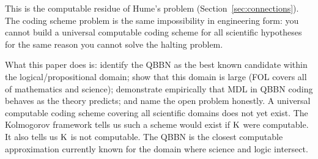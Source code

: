 This is the computable residue of Hume's problem
(Section~\ref{sec:connections}). The coding scheme problem is the same
impossibility in engineering form: you cannot build a universal
computable coding scheme for all scientific hypotheses for the same
reason you cannot solve the halting problem.

What this paper does is: identify the QBBN as the best known candidate
within the logical/propositional domain; show that this domain is
large (FOL covers all of mathematics and science); demonstrate
empirically that MDL in QBBN coding behaves as the theory predicts;
and name the open problem honestly. A universal computable coding
scheme covering all scientific domains does not yet exist. The
Kolmogorov framework tells us such a scheme would exist if $\mathrm{K}$ were
computable. It also tells us $\mathrm{K}$ is not computable. The QBBN is the
closest computable approximation currently known for the domain where
science and logic intersect.
